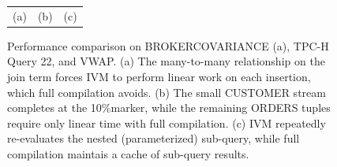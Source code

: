 \begin{figure}
\begin{center}
\begin{minipage}{\textwidth}
\begin{tabular}{ccc}
(a) & (b) & (c)
\end{tabular}
\caption{Performance comparison on BROKERCOVARIANCE (a), TPC-H Query 22, and VWAP.  (a) The many-to-many relationship on the join term forces IVM to perform linear work on each insertion, which full compilation avoids.  (b) The small CUSTOMER stream completes at the 10\%marker, while the remaining ORDERS tuples require only linear time with full compilation. (c) IVM repeatedly re-evaluates the nested (parameterized) sub-query, while full compilation maintais a cache of sub-query results.}
\label{fig:experiments:brokervariance}
\label{fig:experiments:tpch22}
\label{fig:experiments:vwap}
\end{minipage}
\end{center}
\end{figure}

